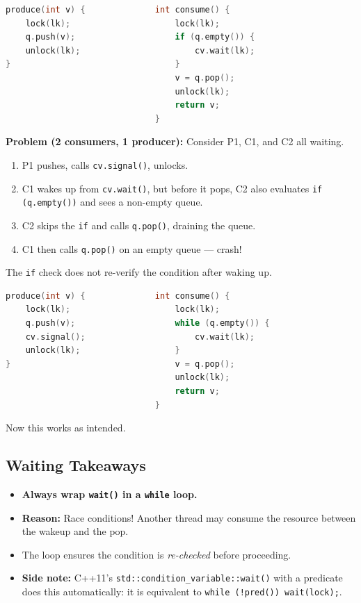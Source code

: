 \documentclass[11pt]{article}
\begin{document}
\begin{lstlisting}[language=C, caption={Attempt 3: Lock + CV with \texttt{if} (BROKEN)}]
produce(int v) {              int consume() {
    lock(lk);                     lock(lk);
    q.push(v);                    if (q.empty()) {
    unlock(lk);                       cv.wait(lk);
}                                 }
                                  v = q.pop();
                                  unlock(lk);
                                  return v;
                              }
\end{lstlisting}

\textbf{Problem (2 consumers, 1 producer):} Consider P1, C1, and C2 all waiting.
\begin{enumerate}
    \item P1 pushes, calls \texttt{cv.signal()}, unlocks.
    \item C1 wakes up from \texttt{cv.wait()}, but before it pops, C2 also evaluates \texttt{if (q.empty())} and sees a non-empty queue.
    \item C2 skips the \texttt{if} and calls \texttt{q.pop()}, draining the queue.
    \item C1 then calls \texttt{q.pop()} on an empty queue --- crash!
\end{enumerate}
The \texttt{if} check does not re-verify the condition after waking up.

\begin{lstlisting}[language=C, caption={Attempt 4: Lock + CV + \texttt{while} (CORRECT)}]
produce(int v) {              int consume() {
    lock(lk);                     lock(lk);
    q.push(v);                    while (q.empty()) {
    cv.signal();                      cv.wait(lk);
    unlock(lk);                   }
}                                 v = q.pop();
                                  unlock(lk);
                                  return v;
                              }
\end{lstlisting}

Now this works as intended.

\subsection{Waiting Takeaways}

\begin{itemize}
    \item \textbf{Always wrap \texttt{wait()} in a \texttt{while} loop.}
    \item \textbf{Reason:} Race conditions! Another thread may consume the resource between the wakeup and the pop.
    \item The loop ensures the condition is \emph{re-checked} before proceeding.
    \item \textbf{Side note:} C++11's \texttt{std::condition\_variable::wait()} with a predicate does this automatically: it is equivalent to \texttt{while (!pred()) wait(lock);}.
\end{itemize}
\end{document}
